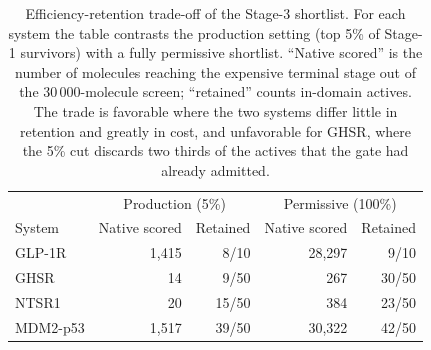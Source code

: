 \begin{table}[!t]
\caption{Efficiency-retention trade-off of the Stage-3 shortlist. For each system the
table contrasts the production setting (top 5\% of Stage-1 survivors) with a fully
permissive shortlist. ``Native scored'' is the number of molecules reaching the
expensive terminal stage out of the 30\,000-molecule screen; ``retained'' counts
in-domain actives. The trade is favorable where the two systems differ little in
retention and greatly in cost, and unfavorable for GHSR, where the 5\% cut discards
two thirds of the actives that the gate had already admitted.}
\label{tab:efficiency}
\centering
\begin{tabular}{lrrrr}
\hline
 & \multicolumn{2}{c}{Production (5\%)} & \multicolumn{2}{c}{Permissive (100\%)} \\
System & Native scored & Retained & Native scored & Retained \\
\hline
GLP-1R & 1,415 & 8/10 & 28,297 & 9/10 \\
GHSR & 14 & 9/50 & 267 & 30/50 \\
NTSR1 & 20 & 15/50 & 384 & 23/50 \\
MDM2-p53 & 1,517 & 39/50 & 30,322 & 42/50 \\
\hline
\end{tabular}
\end{table}
